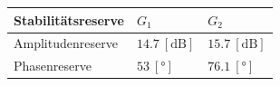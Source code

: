 \begin{table}[h!]
    \centering
    \begin{tabular}{l|ll}
        Stabilitätsreserve  & $G_1$                     & $G_2$ \\
        \hline
        Amplitudenreserve   & $14.7~[\si{\deci\bel}]$   & $15.7~[\si{\deci\bel}]$ \\
        Phasenreserve       & $53~[\si{\degree}]$       & $76.1~[\si{\degree}]$ \\
    \end{tabular}
\end{table}
